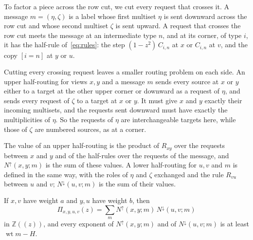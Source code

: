 \documentclass[11pt]{article}
\theoremstyle{definition}
\theoremstyle{definition}
\theoremstyle{remark}
\newcommand{\Z}{\mathbb{Z}}
\newcommand{\wt}{\operatorname{wt}}
\newcommand{\Nup}{N^{\uparrow}}
\newcommand{\Ndown}{N^{\downarrow}}
\begin{document}
To factor a piece across the row cut, we cut every request that crosses it. A message $m=(\eta,\zeta)$ is a label whose first multiset $\eta$ is sent downward across the row cut and whose second multiset $\zeta$ is sent upward. A request that crosses the row cut meets the message at an intermediate type $n$, and at its corner, of type $i$, it has the half-rule of~\eqref{eq:rules}: the step $(1-z^2)\,C_{i,n}$ at $x$ or $C_{i,n}$ at $v$, and the copy $[i=n]$ at $y$ or $u$.

Cutting every crossing request leaves a smaller routing problem on each side. An upper half-routing for views $x,y$ and a message $m$ sends every source at $x$ or $y$ either to a target at the other upper corner or downward as a request of $\eta$, and sends every request of $\zeta$ to a target at $x$ or $y$. It must give $x$ and $y$ exactly their incoming multisets, and the requests sent downward must have exactly the multiplicities of $\eta$. So the requests of $\eta$ are interchangeable targets here, while those of $\zeta$ are numbered sources, as at a corner.

The value of an upper half-routing is the product of $R_{xy}$ over the requests between $x$ and $y$ and of the half-rules over the requests of the message, and $\Nup(x,y;m)$ is the sum of these values. A lower half-routing for $u,v$ and $m$ is defined in the same way, with the roles of $\eta$ and $\zeta$ exchanged and the rule $R_{vu}$ between $u$ and $v$; $\Ndown(u,v;m)$ is the sum of their values.

\begin{lemma}\label{lem:rowcut}
If $x,v$ have weight $a$ and $y,u$ have weight $b$, then
\[
\Pi_{x,y,u,v}(z)=\sum_m\Nup(x,y;m)\,\Ndown(u,v;m)
\]
in $\Z((z))$, and every exponent of $\Nup(x,y;m)$ and of $\Ndown(u,v;m)$ is at least $\wt m-H$.
\end{lemma}
\end{document}
